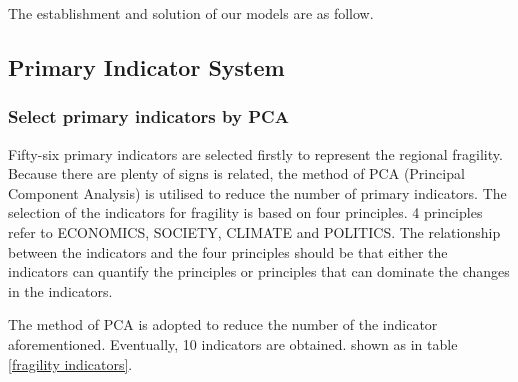 \documentclass{mcmthesis}
\begin{document}
		
		 The establishment and solution of our models are as follow.
		
		
		\subsection{Primary Indicator System}
		
			\subsubsection{Select primary indicators by PCA}
		
				Fifty-six primary indicators are selected firstly to represent the regional fragility. Because there are plenty of signs is related, the method of PCA (Principal Component Analysis) is utilised to reduce the number of primary indicators. The selection of the indicators for fragility is based on four principles. 4 principles refer to ECONOMICS, SOCIETY, CLIMATE and POLITICS. The relationship between the indicators and the four principles should be that either the indicators can quantify the principles or principles that can dominate the changes in the indicators.
			
				The method of PCA is adopted to reduce the number of the indicator aforementioned. Eventually, 10 indicators are obtained. shown as in table \ref{fragility indicators}.
				
\end{document}
